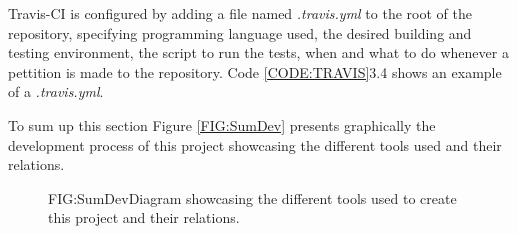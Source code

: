 Travis-CI is configured by adding a file named \textit{.travis.yml} to the root of the repository, specifying programming language used, the desired building and testing environment, the script to run the tests, when and what to do whenever a pettition is made to the repository. Code \ref{CODE:TRAVIS}3.4 shows an example of a \textit{.travis.yml}.

\label{CODE:TRAVIS}


To sum up this section Figure \ref{FIG:SumDev} presents graphically the development process of this project showcasing the different tools used and their relations.

\begin{figure}[Summary of the development process]{FIG:SumDev}{Diagram showcasing the different tools used to create this project and their relations.}
\end{figure}